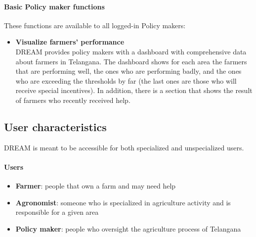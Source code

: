 \paragraph{Basic Policy maker functions} These functions are available to all logged-in Policy makers:
\begin{itemize}
    \item \textbf{Visualize farmers' performance}\\
    DREAM provides policy makers with a dashboard with comprehensive data about farmers in Telangana.
    The dashboard shows for each area the farmers that are performing well, the ones who are performing badly,
    and the ones who are exceeding the thresholds by far (the last ones are those who will receive special incentives).
    \newline In addition, there is a section that shows the result of farmers who recently received help.
\end{itemize}

\newpage
\subsection{User characteristics}

DREAM is meant to be accessible for both specialized and unspecialized users.

\paragraph{Users}
\begin{itemize}
    \item \textbf{Farmer}: people that own a farm and may need help
    \item \textbf{Agronomist}: someone who is specialized in agriculture activity and is responsible for a given area
    \item \textbf{Policy maker}: people who oversight the agriculture process of Telangana
\end{itemize}

\bigskip
